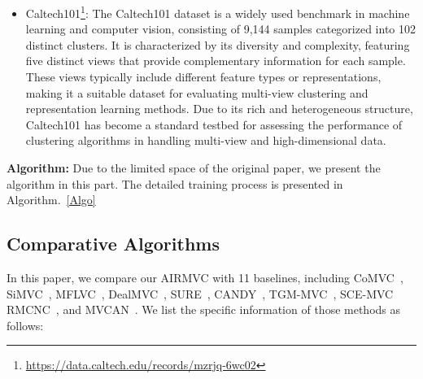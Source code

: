 \documentclass{article}
\theoremstyle{plain}
\theoremstyle{definition}
\theoremstyle{remark}
\begin{document}
\begin{itemize}
\item Caltech101\footnote{\url{https://data.caltech.edu/records/mzrjq-6wc02}}: The Caltech101 dataset is a widely used benchmark in machine learning and computer vision, consisting of 9,144 samples categorized into 102 distinct clusters. It is characterized by its diversity and complexity, featuring five distinct views that provide complementary information for each sample. These views typically include different feature types or representations, making it a suitable dataset for evaluating multi-view clustering and representation learning methods. Due to its rich and heterogeneous structure, Caltech101 has become a standard testbed for assessing the performance of clustering algorithms in handling multi-view and high-dimensional data.
\end{itemize}


\textbf{Algorithm:}
Due to the limited space of the original paper, we present the algorithm in this part. The detailed training process is presented in Algorithm.~\ref{Algo}










\subsection{Comparative Algorithms}\label{com_methods}

In this paper, we compare our AIRMVC with 11 baselines, including CoMVC~\cite{SiMVC}, SiMVC~\cite{SiMVC}, MFLVC~\cite{MFLVC}, DealMVC~\cite{DealMVC}, SURE~\cite{SURE}, CANDY~\cite{candy}, TGM-MVC~\cite{TGM-MVC}, SCE-MVC~\cite{SCE-MVC} RMCNC~\cite{sun2024robust}, and  MVCAN~\cite{MVCAN}. We list the specific information of those methods as follows:
\end{document}
